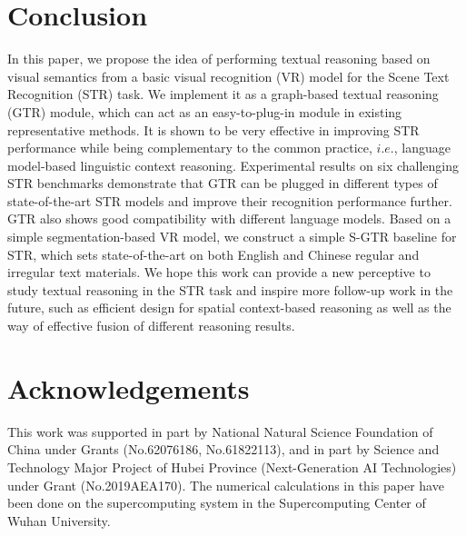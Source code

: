 \documentclass[letterpaper]{article} \usepackage{aaai22}  \usepackage{times}  \usepackage{helvet}  \usepackage{courier}  \usepackage[hyphens]{url}  \usepackage{graphicx} \urlstyle{rm} \def\UrlFont{\rm}  \usepackage{natbib}  \usepackage{caption} \DeclareCaptionStyle{ruled}{labelfont=normalfont,labelsep=colon,strut=off} \frenchspacing  \setlength{\pdfpagewidth}{8.5in}  \setlength{\pdfpageheight}{11in}
\begin{document}
\section{Conclusion}
In this paper, we propose the idea of performing textual reasoning based on visual semantics from a basic visual recognition (VR) model for the Scene Text Recognition (STR) task. We implement it as a graph-based textual reasoning (GTR) module, which can act as an easy-to-plug-in module in existing representative methods. It is shown to be very effective in improving STR performance while being complementary to the common practice, $i.e.$, language model-based linguistic context reasoning. Experimental results on six challenging STR benchmarks demonstrate that GTR can be plugged in different types of state-of-the-art STR models and improve their recognition performance further. GTR also shows good compatibility with different language models. Based on a simple segmentation-based VR model, we construct a simple S-GTR baseline for STR, which sets state-of-the-art on both English and Chinese regular and irregular text materials. We hope this work can provide a new perceptive to study textual reasoning in the STR task and inspire more follow-up work in the future, such as efficient design for spatial context-based reasoning as well as the way of effective fusion of different reasoning results.

\section*{Acknowledgements}
This work was supported in part by National Natural Science Foundation of China under Grants (No.62076186, No.61822113), and in part by Science and Technology Major Project of Hubei Province (Next-Generation AI Technologies) under Grant (No.2019AEA170). The numerical calculations in this paper have been done on the supercomputing system in the Supercomputing Center of Wuhan University.




\end{document}
